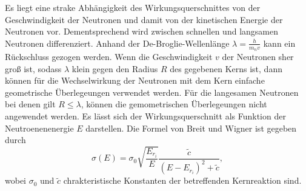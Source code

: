 Es liegt eine strake Abhängigkeit des Wirkungsquerschnittes von der Geschwindigkeit der Neutronen und damit von der
kinetischen Energie der Neutronen vor. Dementsprechend wird zwischen schnellen und langsamen Neutronen differenziert.
Anhand der De-Broglie-Wellenlänge $\lambda = \frac{h}{m_n v}$ kann ein Rückschluss gezogen werden.
Wenn die Geschwindigkeit $v$ der Neutronen sher groß ist, sodass $\lambda$ klein gegen den Radius $R$ des gegebenen Kerns ist, dann
können für die Wechselwirkung der Neutronen mit dem Kern einfache geometrische Überlegeungen verwendet werden.
Für die langesamen Neutronen bei denen gilt $R \leq \lambda$, können die gemometrischen Überlegeungen nicht angewendet werden.
Es lässt sich der Wirkungsquerschnitt als Funktion der Neutroenenenergie $E$ darstellen. Die Formel von Breit und Wigner ist gegeben durch
\begin{equation}
    \sigma(E)=\sigma_0 \sqrt{\frac{E_{r_i}}{E}} \frac{\tilde{c}}{\left(E-E_{r_i}\right)^2+\tilde{c}} ,
    \label{eqn:funktion}
\end{equation}
wobei $\sigma_0$ und $\tilde{c}$ chrakteristische Konstanten der betreffenden Kernreaktion sind.